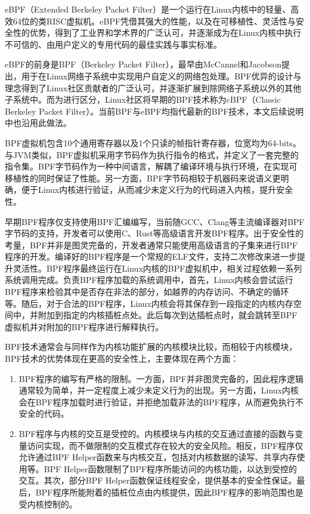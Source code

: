 eBPF（Extended Berkeley Packet Filter）是一个运行在Linux内核中的轻量、高效64位的类RISC虚拟机\citep{sharaf2022extended}。eBPF凭借其强大的性能，以及在可移植性、灵活性与安全性的优势，得到了工业界和学术界的广泛认可，并逐渐成为在Linux内核中执行不可信的、由用户定义的专用代码的最佳实践与事实标准。

eBPF的前身是BPF（Berkeley Packet Filter），最早由McCannel和Jacobson提出\citep{mccanne1993bsd}，用于在Linux网络子系统中实现用户自定义的网络包处理。BPF优异的设计与理念得到了Linux社区贡献者的广泛认可，并逐渐扩展到除网络子系统以外的其他子系统中。而为进行区分，Linux社区将早期的BPF技术称为cBPF（Classic Berkeley Packet Filter）。当前BPF与eBPF均指代最新的BPF技术，本文后续说明中也沿用此做法。

BPF虚拟机包含10个通用寄存器以及1个只读的帧指针寄存器，位宽均为64-bits。与JVM类似，BPF虚拟机采用字节码作为执行指令的格式，并定义了一套完整的指令集。BPF字节码作为一种中间语言，解耦了编译环境与执行环境，在实现可移植性的同时保证了性能。另一方面，BPF字节码相较于机器码来说语义更明确，便于Linux内核进行验证，从而减少未定义行为的代码进入内核，提升安全性。

早期BPF程序仅支持使用BPF汇编编写，当前随GCC、Clang等主流编译器对BPF字节码的支持，开发者可以使用C、Rust等高级语言开发BPF程序\citep{ebpfguidence}。出于安全性的考量，BPF并非是图灵完备的，开发者通常只能使用高级语言的子集来进行BPF程序的开发。编译好的BPF程序是一个常规的ELF文件，支持二次修改来进一步提升灵活性。BPF程序最终运行在Linux内核的BPF虚拟机中，相关过程依赖一系列系统调用完成。负责BPF程序加载的系统调用中，首先，Linux内核会尝试运行BPF程序来检验其中是否存在非法的部分，如越界的内存访问、不确定的循环等。随后，对于合法的BPF程序，Linux内核会将其保存到一段指定的内核内存空间中，并附加到指定的内核插桩点处。此后每次到达插桩点时，就会跳转至BPF虚拟机并对附加的BPF程序进行解释执行。

BPF技术通常会与同样作为内核功能扩展的内核模块比较，而相较于内核模块，BPF技术的优势体现在更高的安全性上，主要体现在两个方面：

\begin{enumerate}
    \item BPF程序的编写有严格的限制。一方面，BPF并非图灵完备的，因此程序逻辑通常较为简单，并一定程度上减少未定义行为的出现。另一方面，Linux内核会在BPF程序加载时进行验证，并拒绝加载非法的BPF程序，从而避免执行不安全的代码。
    \item BPF程序与内核的交互是受控的。内核模块与内核的交互通过直接的函数与变量访问实现，而不做限制的交互模式存在较大的安全风险。相反，BPF程序仅允许通过BPF Helper函数来与内核交互，包括对内核数据的读写、共享内存使用等。BPF Helper函数限制了BPF程序所能访问的内核功能，以达到受控的交互。其次，部分BPF Helper函数保证线程安全，提供基本的安全性保证。最后，BPF程序所能附着的插桩位点由内核提供，因此BPF程序的影响范围也是受内核控制的。
\end{enumerate}


